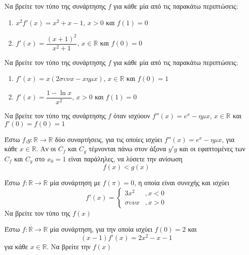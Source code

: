 \documentclass{presentation}
\begin{document}
\begin{askisi}
    Να βρείτε τον τύπο της συνάρτησης $f$ για κάθε μία από τις παρακάτω περιπτώσεις:
    \begin{enumerate}[<+->]
        \item $x^2f'(x)=x^2+x-1$, $x>0$ και $f(1)=0$
        \item $f'(x)=\dfrac{(x+1)^2}{x^2+1}$, $x\in\mathbb{R}$ και $f(0)=0$
    \end{enumerate}
\end{askisi}

\begin{askisi}
    Να βρείτε τον τύπο της συνάρτησης $f$ για κάθε μία από τις παρακάτω περιπτώσεις:
    \begin{enumerate}[<+->]
        \item $f'(x)=x(2συνx-xημx)$, $x\in\mathbb{R}$ και $f(0)=1$
        \item $f'(x)=\dfrac{1-\ln x}{x^2}$, $x>0$ και $f(1)=0$
    \end{enumerate}
\end{askisi}

\begin{askisi}
    Να βρείτε τον τύπο της συνάρτησης $f$ όταν ισχύουν $f''(x)=e^x-ημx$, $x\in\mathbb{R}$ και $f'(0)=f(0)=1$
\end{askisi}

\begin{askisi}
    Έστω $f$,$g:\mathbb{R}\to\mathbb{R}$ δύο συναρτήσεις, για τις οποίες ισχύει $f''(x)=e^x-ημx$, για κάθε $x\in\mathbb{R}$. Αν οι $C_f$ και $C_g$ τέμνονται πάνω στον άξονα $y'y$ και οι εφαπτομένες των $C_f$ και $C_g$ στο $x_0=1$ είναι παράληλες, να λύσετε την ανίσωση
    $$f(x)<g(x)$$
\end{askisi}

\begin{askisi}
    Έστω $f:\mathbb{R}\to\mathbb{R}$ μία συνάρτηση με $f(π)=0$, η οποία είναι συνεχής και ισχύει
    $$f'(x)=\begin{cases}
            3x^2 & ,x<0 \\
            συνx & ,x>0
        \end{cases}$$
    Να βρείτε τον τύπο της $f(x)$
\end{askisi}

\begin{askisi}
    Έστω $f:\mathbb{R}\to\mathbb{R}$ μία συνάρτηση, για την οποία ισχύει $f(0)=2$ και
    $$(x-1)f'(x)=2x^2-x-1$$
    για κάθε $x\in\mathbb{R}$. Να βρείτε την $f(x)$
\end{askisi}
\end{document}
